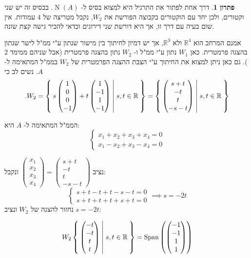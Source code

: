 \documentclass[12pt]{report}
\theoremstyle{plain}
\theoremstyle{definition}
\newtheorem*{solution}{פתרון}
\newcommand{\R}{\mathbb{R}}
\newcommand{\0}{\mathbf{0}}
\DeclareMathOperator{\Span}{Span}
\DeclareMathOperator{\Null}{N}
\begin{document}
\begin{solution}
דרך אחת לפתור את התרגיל היא למצוא בסיס ל-
$\Null(A)$.
בבסיס זה יש שני וקטורים, ולכן יחד עם הוקטורים בקבוצה הפורשת את
$W_2$,
נקבל מטריצה של 
$4$
עמודות. אין שום בעיה עם דרך זו, אך היא דורשת שני דירוגים וכדאי להכיר גישה קצת שונה.

אמנם המרחב הוא 
$\R^4$
ולא 
$\R^3$,
אך יש דמיון לחיתוך בין מישור שנתון ע"י ממ"ל לישר שנתון בהצגה פרמטרית.
כאן
$W_1$
נתון ע"י ממ"ל
ו-
$W_2$
נתון בהצגה פרמטרית (אבל שניהם ממימד 
$2$).
גם כאן ניתן למצוא את החיתוך ע"י הצבת ההצגה הפרמטרית של 
$W_2$
בממ"ל המתאימה ל-
$A$.
נשים לב כי
$$
.W_2=\Set{s\begin{pmatrix}1\\0\\0\\-1\end{pmatrix}+t\begin{pmatrix}1\\-1\\1\\-1\end{pmatrix}|s,t\in\R}=\Set{\begin{pmatrix}s+t\\-t\\t\\-s-t\end{pmatrix}|s,t\in\R}
$$

הממ"ל המתאימה ל-
$A$ 
היא:
$$
\begin{cases}
x_1+x_2+x_3+x_4=0 \\
x_1-x_2+x_3-x_4=0
\end{cases}
$$

נציב
$\begin{pmatrix}x_1\\x_2\\x_3\\x_4\end{pmatrix}=\begin{pmatrix}s+t\\-t\\t\\-s-t\end{pmatrix}$
ונקבל:
$$
\begin{cases}
s+t-t+t-s-t=0 \\
s+t+t+t+s+t=0
\end{cases} \implies s=-2t
$$
נחזור להצגה של
$W_2$
ונציב
$s=-2t$:

$$
W_2\Set{\begin{pmatrix}-t\\-t\\t\\t\end{pmatrix}|s,t\in\R}=\Span\left(\begin{pmatrix}-1 \\ -1 \\ 1 \\ 1\end{pmatrix}\right)
$$


\end{solution}
\end{document}
